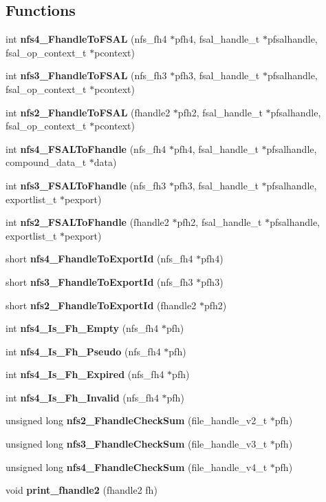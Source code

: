 \subsection*{Functions}
\begin{CompactItemize}
\item 
int {\bf nfs4\_\-Fhandle\-To\-FSAL} (nfs\_\-fh4 $\ast$pfh4, fsal\_\-handle\_\-t $\ast$pfsalhandle, fsal\_\-op\_\-context\_\-t $\ast$pcontext)
\item 
int {\bf nfs3\_\-Fhandle\-To\-FSAL} (nfs\_\-fh3 $\ast$pfh3, fsal\_\-handle\_\-t $\ast$pfsalhandle, fsal\_\-op\_\-context\_\-t $\ast$pcontext)
\item 
int {\bf nfs2\_\-Fhandle\-To\-FSAL} (fhandle2 $\ast$pfh2, fsal\_\-handle\_\-t $\ast$pfsalhandle, fsal\_\-op\_\-context\_\-t $\ast$pcontext)
\item 
int {\bf nfs4\_\-FSALTo\-Fhandle} (nfs\_\-fh4 $\ast$pfh4, fsal\_\-handle\_\-t $\ast$pfsalhandle, compound\_\-data\_\-t $\ast$data)
\item 
int {\bf nfs3\_\-FSALTo\-Fhandle} (nfs\_\-fh3 $\ast$pfh3, fsal\_\-handle\_\-t $\ast$pfsalhandle, exportlist\_\-t $\ast$pexport)
\item 
int {\bf nfs2\_\-FSALTo\-Fhandle} (fhandle2 $\ast$pfh2, fsal\_\-handle\_\-t $\ast$pfsalhandle, exportlist\_\-t $\ast$pexport)
\item 
short {\bf nfs4\_\-Fhandle\-To\-Export\-Id} (nfs\_\-fh4 $\ast$pfh4)
\item 
short {\bf nfs3\_\-Fhandle\-To\-Export\-Id} (nfs\_\-fh3 $\ast$pfh3)
\item 
short {\bf nfs2\_\-Fhandle\-To\-Export\-Id} (fhandle2 $\ast$pfh2)
\item 
int {\bf nfs4\_\-Is\_\-Fh\_\-Empty} (nfs\_\-fh4 $\ast$pfh)
\item 
int {\bf nfs4\_\-Is\_\-Fh\_\-Pseudo} (nfs\_\-fh4 $\ast$pfh)
\item 
int {\bf nfs4\_\-Is\_\-Fh\_\-Expired} (nfs\_\-fh4 $\ast$pfh)
\item 
int {\bf nfs4\_\-Is\_\-Fh\_\-Invalid} (nfs\_\-fh4 $\ast$pfh)
\item 
unsigned long {\bf nfs2\_\-Fhandle\-Check\-Sum} (file\_\-handle\_\-v2\_\-t $\ast$pfh)
\item 
unsigned long {\bf nfs3\_\-Fhandle\-Check\-Sum} (file\_\-handle\_\-v3\_\-t $\ast$pfh)
\item 
unsigned long {\bf nfs4\_\-Fhandle\-Check\-Sum} (file\_\-handle\_\-v4\_\-t $\ast$pfh)
\item 
void {\bf print\_\-fhandle2} (fhandle2 fh)
\item 

\end{CompactItemize}
